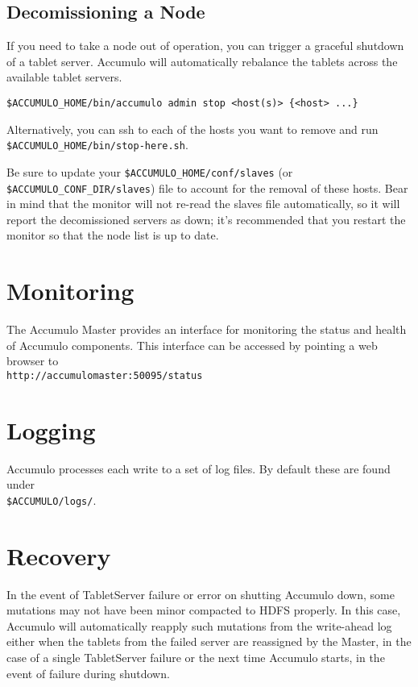 \subsection{Decomissioning a Node}

If you need to take a node out of operation, you can trigger a graceful shutdown of a tablet 
server. Accumulo will automatically rebalance the tablets across the available tablet servers.

\begin{verbatim}
$ACCUMULO_HOME/bin/accumulo admin stop <host(s)> {<host> ...}
\end{verbatim}

Alternatively, you can ssh to each of the hosts you want to remove and run 
\texttt{\$ACCUMULO_HOME/bin/stop-here.sh}.

Be sure to update your \texttt{\$ACCUMULO_HOME/conf/slaves} (or \texttt{\$ACCUMULO_CONF_DIR/slaves}) file to 
account for the removal of these hosts. Bear in mind that the monitor will not re-read the 
slaves file automatically, so it will report the decomissioned servers as down; it's 
recommended that you restart the monitor so that the node list is up to date.

\section{Monitoring}

The Accumulo Master provides an interface for monitoring the status and health of
Accumulo components. This interface can be accessed by pointing a web browser to\\
\texttt{http://accumulomaster:50095/status}

\section{Logging}
Accumulo processes each write to a set of log files. By default these are found under\\
\texttt{\$ACCUMULO/logs/}.

\section{Recovery}

In the event of TabletServer failure or error on shutting Accumulo down, some
mutations may not have been minor compacted to HDFS properly. In this case,
Accumulo will automatically reapply such mutations from the write-ahead log
either when the tablets from the failed server are reassigned by the Master, in the
case of a single TabletServer failure or the next time Accumulo starts, in the event of
failure during shutdown.

